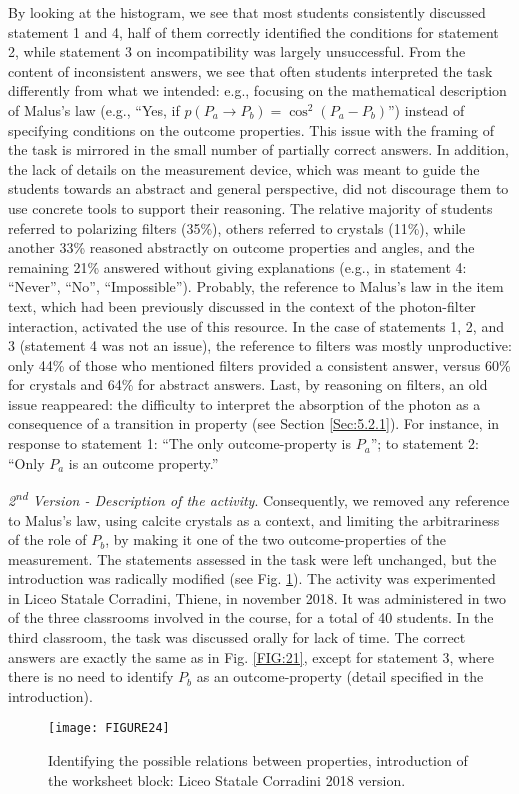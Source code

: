 \documentclass[twocolumn,secnumarabic,amssymb, nobibnotes, aps, prd, nofootinbib]{revtex4-2}
\begin{document}
By looking at the histogram, we see that most students consistently discussed statement 1 and 4, half of them correctly identified the conditions for statement 2, while statement 3 on incompatibility was largely unsuccessful. From the content of inconsistent answers, we see that often students interpreted the task differently from what we intended: e.g., focusing on the mathematical description of Malus's law (e.g., ``Yes, if $p(P_a \rightarrow P_b) = \cos^2(P_a-P_b)$'') instead of specifying conditions on the outcome properties. This issue with the framing of the task is mirrored in the small number of partially correct answers. In addition, the lack of details on the measurement device, which was meant to guide the students towards an abstract and general perspective, did not discourage them to use concrete tools to support their reasoning. The relative majority of students referred to polarizing filters (35\%), others referred to crystals (11\%), while another 33\% reasoned abstractly on outcome properties and angles, and the remaining 21\% answered without giving explanations (e.g., in statement 4: ``Never'', ``No'', ``Impossible''). Probably, the reference to Malus's law in the item text, which had been previously discussed in the context of the photon-filter interaction, activated the use of this resource. In the case of statements 1, 2, and 3 (statement 4 was not an issue), the reference to filters was mostly unproductive: only 44\% of those who mentioned filters provided a consistent answer, versus 60\% for crystals and 64\% for abstract answers. Last, by reasoning on filters, an old issue reappeared: the difficulty to interpret the absorption of the photon as a consequence of a transition in property (see Section \ref{Sec:5.2.1}). For instance, in response to statement 1: ``The only outcome-property is $P_a$''; to statement 2: ``Only $P_a$ is an outcome property.''

\emph{2\textsuperscript{nd} Version - Description of the activity}. Consequently, we removed any reference to Malus's law, using calcite crystals as a context, and limiting the arbitrariness of the role of $P_b$, by making it one of the two outcome-properties of the measurement. The statements assessed in the task were left unchanged, but the introduction was radically modified (see Fig. \ref{FIG:24}). The activity was experimented in Liceo Statale Corradini, Thiene, in november 2018. It was administered in two of the three classrooms involved in the course, for a total of 40 students. In the third classroom, the task was discussed orally for lack of time. The correct answers are exactly the same as in Fig. \ref{FIG:21}, except for statement 3, where there is no need to identify $P_b$ as an outcome-property (detail specified in the introduction).
\begin{figure}[!htpb]
       \texttt{[image: FIGURE24]}
    \caption{Identifying the possible relations between properties, introduction of the worksheet block: Liceo Statale Corradini 2018 version.}
    \label{FIG:24}
\end{figure}
\end{document}
